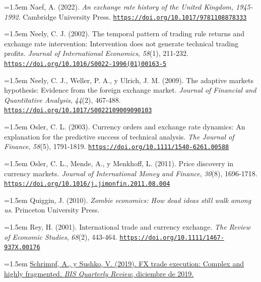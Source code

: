 \documentclass[10pt,a4paper]{article}
\begin{document}
\noindent\hangindent=1.5em Naef, A. (2022). \textit{An exchange rate history of the United Kingdom, 1945-1992}. Cambridge University Press. \href{https://doi.org/10.1017/9781108878333}{\nolinkurl{https://doi.org/10.1017/9781108878333}}

\noindent\hangindent=1.5em Neely, C. J. (2002). The temporal pattern of trading rule returns and exchange rate intervention: Intervention does not generate technical trading profits. \textit{Journal of International Economics}, \textit{58}(1), 211-232. \href{https://doi.org/10.1016/S0022-1996(01)00163-5}{\nolinkurl{https://doi.org/10.1016/S0022-1996(01)00163-5}}

{\sloppy\noindent\hangindent=1.5em Neely, C. J., Weller, P. A., y Ulrich, J. M. (2009). The adaptive markets hypothesis: Evidence from the foreign exchange market. \textit{Journal of Financial and Quantitative Analysis}, \textit{44}(2), 467-488. \href{https://doi.org/10.1017/S0022109009090103}{\nolinkurl{https://doi.org/10.1017/S0022109009090103}}\par}

\noindent\hangindent=1.5em Osler, C. L. (2003). Currency orders and exchange rate dynamics: An explanation for the predictive success of technical analysis. \textit{The Journal of Finance}, \textit{58}(5), 1791-1819. \href{https://doi.org/10.1111/1540-6261.00588}{\nolinkurl{https://doi.org/10.1111/1540-6261.00588}}

\noindent\hangindent=1.5em Osler, C. L., Mende, A., y Menkhoff, L. (2011). Price discovery in currency markets. \textit{Journal of International Money and Finance}, \textit{30}(8), 1696-1718. \href{https://doi.org/10.1016/j.jimonfin.2011.08.004}{\nolinkurl{https://doi.org/10.1016/j.jimonfin.2011.08.004}}

\noindent\hangindent=1.5em Quiggin, J. (2010). \textit{Zombie economics: How dead ideas still walk among us}. Princeton University Press.

\noindent\hangindent=1.5em Rey, H. (2001). International trade and currency exchange. \textit{The Review of Economic Studies}, \textit{68}(2), 443-464. \href{https://doi.org/10.1111/1467-937X.00176}{\nolinkurl{https://doi.org/10.1111/1467-937X.00176}}

\noindent\hangindent=1.5em \href{https://www.bis.org/publ/qtrpdf/r_qt1912g.htm}{Schrimpf, A., y Sushko, V. (2019). FX trade execution: Complex and highly fragmented. \textit{BIS Quarterly Review}, diciembre de 2019.}
\end{document}
